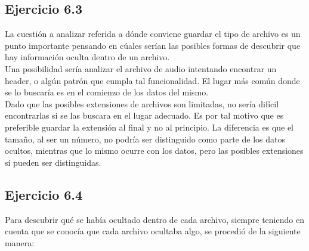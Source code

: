 \documentclass{article}
\begin{document}
\subsection{Ejercicio 6.3}

\noindent La cuestión a analizar referida a dónde conviene guardar el tipo de archivo es un punto importante pensando en cúales serían las posibles formas de descubrir que hay información oculta dentro de un archivo.\\
Una posibilidad sería analizar el archivo de audio intentando encontrar un header, o algún patrón que cumpla tal funcionalidad. El lugar más común donde se lo buscaría es en el comienzo de los datos del mismo.\\
Dado que las posibles extensiones de archivos son limitadas, no sería difícil encontrarlas si se las buscara en el lugar adecuado. Es por tal motivo que es preferible guardar la extensión al final y no al principio. La diferencia es que el tamaño, al ser un número, no podría ser distinguido como parte de los datos ocultos, mientras que lo mismo ocurre con los datos, pero las posibles extensiones sí pueden ser distinguidas.

\subsection{Ejercicio 6.4}

\noindent Para descubrir qué se había ocultado dentro de cada archivo, siempre teniendo en cuenta que se conocía que cada archivo ocultaba algo, se procedió de la siguiente manera:\\
\end{document}
